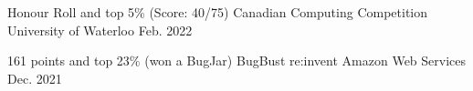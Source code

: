 
\begin{cvhonors}


  \cvhonor
    {Honour Roll and top 5\% (Score: 40/75)} %
    {Canadian Computing Competition} %
    {University of Waterloo} %
    {Feb. 2022} %

  \cvhonor
    {161 points and top 23\% (won a BugJar)}
    {BugBust re:invent}
    {Amazon Web Services}
    {Dec. 2021}


\end{cvhonors}
